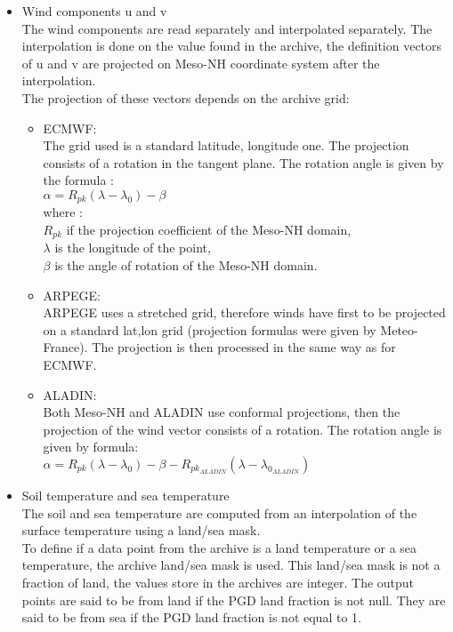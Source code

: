 \begin{itemize}
\item Wind components u and v\\
The wind components are read separately and interpolated separately. The interpolation is
done on the value found in the archive, the definition vectors of u and v are projected
on Meso-NH coordinate system after the interpolation.\\
The projection of these vectors depends on the archive grid:
\begin{itemize}
\item ECMWF:\\
The grid used is a standard latitude, longitude one. The projection consists of a rotation
in the tangent plane. The rotation angle is given by the formula :\\
$\alpha=R_{pk}(\lambda-\lambda_0)-\beta$\\
where :\\
$R_{pk}$ if the projection coefficient of the Meso-NH domain,\\
$\lambda$ is the longitude of the point,\\
$\beta$ is the angle of rotation of the Meso-NH domain.
\item ARPEGE: \\
ARPEGE uses a stretched grid, therefore winds have first to be projected on a
 standard lat,lon grid (projection formulas were given by Meteo-France). The
projection is then processed in the same way as for ECMWF.
\item ALADIN: \\
Both Meso-NH and ALADIN use conformal projections, then the projection of the wind vector
consists of a rotation. The rotation angle is given by formula:\\
$\alpha=R_{pk}(\lambda-\lambda_0)-\beta - R_{pk_{ALADIN}}(\lambda-\lambda_{0_{ALADIN}})$
\end{itemize}
\item Soil temperature and sea temperature\\
The soil and sea temperature are computed from an interpolation of the surface temperature
using a land/sea mask.\\
To define if a data point from the archive is a land temperature or a sea temperature,
the archive land/sea mask is used. This land/sea mask is not a fraction of land, the
values store in the archives are integer. The output points are said to be from land
if the PGD land fraction is not null. They are said to be from sea if the PGD land
fraction is not equal to 1.\\

\end{itemize}
